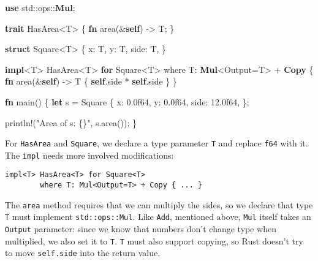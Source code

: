 \documentclass[a4paper,]{book}
\newenvironment{Shaded}{\begin{snugshade}}{\end{snugshade}}
\newcommand{\KeywordTok}[1]{\textcolor[rgb]{0.13,0.29,0.53}{\textbf{{#1}}}}
\newcommand{\DecValTok}[1]{\textcolor[rgb]{0.00,0.00,0.81}{{#1}}}
\newcommand{\StringTok}[1]{\textcolor[rgb]{0.31,0.60,0.02}{{#1}}}
\newcommand{\OtherTok}[1]{\textcolor[rgb]{0.56,0.35,0.01}{{#1}}}
\newcommand{\NormalTok}[1]{{#1}}
\begin{document}
\begin{Shaded}
\begin{Highlighting}[]
\KeywordTok{use} \NormalTok{std::ops::}\KeywordTok{Mul}\NormalTok{;}

\KeywordTok{trait} \NormalTok{HasArea<T> \{}
    \KeywordTok{fn} \NormalTok{area(&}\KeywordTok{self}\NormalTok{) -> T;}
\NormalTok{\}}

\KeywordTok{struct} \NormalTok{Square<T> \{}
    \NormalTok{x: T,}
    \NormalTok{y: T,}
    \NormalTok{side: T,}
\NormalTok{\}}

\KeywordTok{impl}\NormalTok{<T> HasArea<T> }\KeywordTok{for} \NormalTok{Square<T>}
        \NormalTok{where T: }\KeywordTok{Mul}\NormalTok{<Output=T> + }\KeywordTok{Copy} \NormalTok{\{}
    \KeywordTok{fn} \NormalTok{area(&}\KeywordTok{self}\NormalTok{) -> T \{}
        \KeywordTok{self}\NormalTok{.side * }\KeywordTok{self}\NormalTok{.side}
    \NormalTok{\}}
\NormalTok{\}}

\KeywordTok{fn} \NormalTok{main() \{}
    \KeywordTok{let} \NormalTok{s = Square \{}
        \NormalTok{x: }\DecValTok{0.0f64}\NormalTok{,}
        \NormalTok{y: }\DecValTok{0.0f64}\NormalTok{,}
        \NormalTok{side: }\DecValTok{12.0f64}\NormalTok{,}
    \NormalTok{\};}

    \OtherTok{println!}\NormalTok{(}\StringTok{"Area of s: \{\}"}\NormalTok{, s.area());}
\NormalTok{\}}
\end{Highlighting}
\end{Shaded}

For \texttt{HasArea} and \texttt{Square}, we declare a type parameter
\texttt{T} and replace \texttt{f64} with it. The \texttt{impl} needs
more involved modifications:

\begin{verbatim}
impl<T> HasArea<T> for Square<T>
        where T: Mul<Output=T> + Copy { ... }
\end{verbatim}

The \texttt{area} method requires that we can multiply the sides, so we
declare that type \texttt{T} must implement \texttt{std::ops::Mul}. Like
\texttt{Add}, mentioned above, \texttt{Mul} itself takes an
\texttt{Output} parameter: since we know that numbers don't change type
when multiplied, we also set it to \texttt{T}. \texttt{T} must also
support copying, so Rust doesn't try to move \texttt{self.side} into the
return value.

\end{document}
